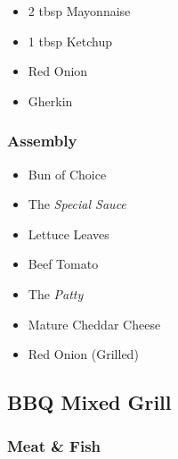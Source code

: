 \documentclass[11pt, english]{article}
\begin{document}
	\begin{itemize}
        \setlength\itemsep{0cm}
		\item 2 tbsp Mayonnaise
		\item 1 tbsp Ketchup
		\item Red Onion
		\item Gherkin
        \end{itemize}

		\subsubsection*{Assembly}

	\begin{itemize}
        \setlength\itemsep{0cm}
		\item Bun of Choice
		\item The \textit{Special Sauce}
		\item Lettuce Leaves
		\item Beef Tomato
		\item The \textit{Patty}
		\item Mature Cheddar Cheese
		\item Red Onion (Grilled)
        \end{itemize}

\newpage

	\subsection{BBQ Mixed Grill}

		\subsubsection*{Meat \& Fish}
\end{document}
